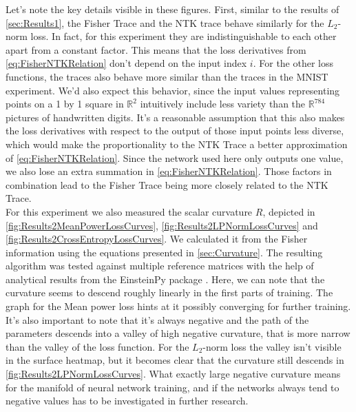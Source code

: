 Let's note the key details visible in these figures. First, similar to the results of \cref{sec:Results1}, the Fisher Trace and the NTK trace behave similarly for the $L_2$-norm loss. In fact, for this experiment they are indistinguishable to each other apart from a constant factor. This means that the loss derivatives from \cref{eq:FisherNTKRelation} don't depend on the input index $i$. For the other loss functions, the traces also behave more similar than the traces in the MNIST experiment. We'd also expect this behavior, since the input values representing points on a 1 by 1 square in $\mathbb{R}^2$ intuitively include less variety than the $\mathbb{R}^{784}$ pictures of handwritten digits. It's a reasonable assumption that this also makes the loss derivatives with respect to the output of those input points less diverse, which would make the proportionality to the NTK Trace a better approximation of \cref{eq:FisherNTKRelation}. Since the network used here only outputs one value, we also lose an extra summation in \cref{eq:FisherNTKRelation}. Those factors in combination lead to the Fisher Trace being more closely related to the NTK Trace.\\
For this experiment we also measured the scalar curvature $R$, depicted in \cref{fig:Results2MeanPowerLossCurves}, \cref{fig:Results2LPNormLossCurves} and \cref{fig:Results2CrossEntropyLossCurves}. We calculated it from the Fisher information using the equations presented in \cref{sec:Curvature}. The resulting algorithm was tested against multiple reference matrices with the help of analytical results from the EinsteinPy package \cite{EinsteinPyPackage}. Here, we can note that the curvature seems to descend roughly linearly in the first parts of training. The graph for the Mean power loss hints at it possibly converging for further training. It's also important to note that it's always negative and the path of the parameters descends into a valley of high negative curvature, that is more narrow than the valley of the loss function. For the $L_2$-norm loss the valley isn't visible in the surface heatmap, but it becomes clear that the curvature still descends in \cref{fig:Results2LPNormLossCurves}. What exactly large negative curvature means for the manifold of neural network training, and if the networks always tend to negative values has to be investigated in further research.